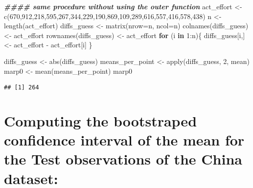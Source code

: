 \documentclass[
]{book}
\newenvironment{Shaded}{\begin{snugshade}}{\end{snugshade}}
\newcommand{\AttributeTok}[1]{\textcolor[rgb]{0.77,0.63,0.00}{#1}}
\newcommand{\ControlFlowTok}[1]{\textcolor[rgb]{0.13,0.29,0.53}{\textbf{#1}}}
\newcommand{\DecValTok}[1]{\textcolor[rgb]{0.00,0.00,0.81}{#1}}
\newcommand{\DocumentationTok}[1]{\textcolor[rgb]{0.56,0.35,0.01}{\textbf{\textit{#1}}}}
\newcommand{\FunctionTok}[1]{\textcolor[rgb]{0.00,0.00,0.00}{#1}}
\newcommand{\NormalTok}[1]{#1}
\newcommand{\OtherTok}[1]{\textcolor[rgb]{0.56,0.35,0.01}{#1}}
\newcommand{\SpecialCharTok}[1]{\textcolor[rgb]{0.00,0.00,0.00}{#1}}
\begin{document}
\begin{Shaded}
\begin{Highlighting}[]
\DocumentationTok{\#\#\#\# same procedure without using the outer function}
\NormalTok{act\_effort }\OtherTok{\textless{}{-}}
  \FunctionTok{c}\NormalTok{(}\DecValTok{670}\NormalTok{,}\DecValTok{912}\NormalTok{,}\DecValTok{218}\NormalTok{,}\DecValTok{595}\NormalTok{,}\DecValTok{267}\NormalTok{,}\DecValTok{344}\NormalTok{,}\DecValTok{229}\NormalTok{,}\DecValTok{190}\NormalTok{,}\DecValTok{869}\NormalTok{,}\DecValTok{109}\NormalTok{,}\DecValTok{289}\NormalTok{,}\DecValTok{616}\NormalTok{,}\DecValTok{557}\NormalTok{,}\DecValTok{416}\NormalTok{,}\DecValTok{578}\NormalTok{,}\DecValTok{438}\NormalTok{)}
\NormalTok{n }\OtherTok{\textless{}{-}} \FunctionTok{length}\NormalTok{(act\_effort)}
\NormalTok{diffs\_guess }\OtherTok{\textless{}{-}} \FunctionTok{matrix}\NormalTok{(}\AttributeTok{nrow=}\NormalTok{n, }\AttributeTok{ncol=}\NormalTok{n)}
\FunctionTok{colnames}\NormalTok{(diffs\_guess) }\OtherTok{\textless{}{-}}\NormalTok{ act\_effort}
\FunctionTok{rownames}\NormalTok{(diffs\_guess) }\OtherTok{\textless{}{-}}\NormalTok{ act\_effort }
\ControlFlowTok{for}\NormalTok{ (i }\ControlFlowTok{in} \DecValTok{1}\SpecialCharTok{:}\NormalTok{n)\{}
\NormalTok{  diffs\_guess[i,] }\OtherTok{\textless{}{-}}\NormalTok{ act\_effort }\SpecialCharTok{{-}}\NormalTok{ act\_effort[i]}
\NormalTok{\}}

\NormalTok{diffs\_guess }\OtherTok{\textless{}{-}} \FunctionTok{abs}\NormalTok{(diffs\_guess)}
\NormalTok{means\_per\_point }\OtherTok{\textless{}{-}} \FunctionTok{apply}\NormalTok{(diffs\_guess, }\DecValTok{2}\NormalTok{, mean)}
\NormalTok{marp0 }\OtherTok{\textless{}{-}} \FunctionTok{mean}\NormalTok{(means\_per\_point)}
\NormalTok{marp0}
\end{Highlighting}
\end{Shaded}

\begin{verbatim}
## [1] 264
\end{verbatim}

\hypertarget{computing-the-bootstraped-confidence-interval-of-the-mean-for-the-test-observations-of-the-china-dataset}{%
\section{Computing the bootstraped confidence interval of the mean for the Test observations of the China dataset:}\label{computing-the-bootstraped-confidence-interval-of-the-mean-for-the-test-observations-of-the-china-dataset}}
\end{document}
